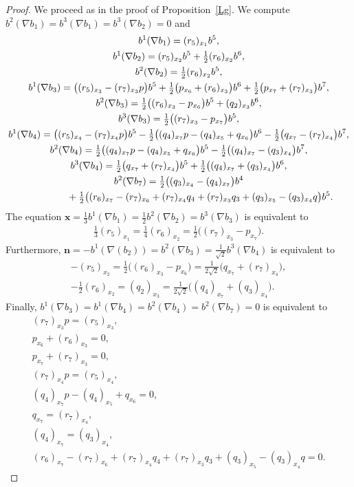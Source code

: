 \documentclass[pdftex]{sigma}
\numberwithin{equation}{section}
\newcommand\bx{{\mathbf x}}
\newcommand\bn{{\mathbf n}}
\begin{document}
\begin{proof}
We proceed as in the proof of Proposition~\ref{Lg}. We compute $b^2(\nabla b_1)=b^3(\nabla b_1) =b^3(\nabla b_2) =0$ and
\begin{gather*}
b^1(\nabla b_1) = (r_5)_{x_1} b^5, \\
b^1(\nabla b_2)= (r_5)_{x_2} b^5+\tfrac12 (r_6)_{x_2} b^6,\\
b^2(\nabla b_2)= \tfrac12 (r_6)_{x_2} b^5,\\
b^1(\nabla b_3)= \big((r_5)_{x_3}- (r_7)_{x_3 }p\big) b^5+\tfrac12 \big(p_{x_6}+(r_6)_{x_3}\big) b^6+\tfrac12 \big(p_{x_7}+(r_7)_{x_3}\big) b^7,\\
 b^2(\nabla b_3)= \tfrac12 \big((r_6)_{x_3}-p_{x_6}\big) b^5 +(q_2)_{x_3}b^6,\\
b^3(\nabla b_3)= \tfrac12 \big((r_7)_{x_3}-p_{x_7}\big) b^5,\\
b^1(\nabla b_4)= \big((r_5)_{x_4}-(r_7)_{x_4}p\big)b^5-\tfrac12\big((q_4)_{x_7}p-(q_4)_{x_5}+q_{x_6} \big)b^6-\tfrac12\big(q_{x_7}-(r_7)_{x_4}\big)b^7,\\
b^2(\nabla b_4)= \tfrac12\big((q_4)_{x_7}p-(q_4)_{x_5}+q_{x_6}\big)b^5-\tfrac12\big((q_4)_{x_7}-(q_3)_{x_4}\big)b^7,\\
b^3(\nabla b_4)= \tfrac12\big(q_{x_7}+(r_7)_{x_4}\big)b^5+\tfrac12\big((q_4)_{x_7}+(q_3)_{x_4}\big)b^6,\\
b^2(\nabla b_7)= \tfrac12\big((q_3)_{x_4}-(q_4)_{x_7}\big)b^4 \\
\hphantom{b^2(\nabla b_7)=}{} +\tfrac12\big((r_6)_{x_7} -(r_7)_{x_6}+(r_7)_{x_4}q_4+(r_7)_{x_3}q_3+(q_3)_{x_5}-(q_3)_{x_4}q\big)b^5.
\end{gather*}
The equation $\bx=\frac13 b^1(\nabla b_1)=\frac12 b^2(\nabla b_2)=b^3(\nabla b_3)$ is equivalent to
\begin{gather}
\tfrac13(r_5)_{x_1} = \tfrac14(r_6)_{x_2} =\tfrac12 \big((r_7)_{x_3}-p_{x_7}\big).\label{ED1}
\end{gather}
Furthermore, $\bn=-b^1(\nabla(b_2))=b^2(\nabla b_3)=\frac1{\sqrt 2} b^3(\nabla b_4)$ is equivalent to
\begin{gather}
 -(r_5)_{x_2} =\tfrac12 \big((r_6)_{x_3}-p_{x_6}\big)=\tfrac1{2\sqrt 2} \big(q_{x_7}+(r_7)_{x_4}\big),\label{ED2}\\
- \tfrac12 (r_6)_{x_2} =(q_2)_{x_3} =\tfrac1{2\sqrt 2}\big((q_4)_{x_7}+(q_3)_{x_4}\big).\label{ED3}
\end{gather}
Finally, $ b^1(\nabla b_3) =b^1(\nabla b_4)=b^2(\nabla b_4 )=b^2(\nabla b_7)=0$ is equivalent to
\begin{gather}
 (r_7)_{x_3 }p=(r_5)_{x_3}, \label{ED4}\\
 p_{x_6}+(r_6)_{x_3}=0, \label{ED5}\\
 p_{x_7}+(r_7)_{x_3}=0, \label{ED6}\\
(r_7)_{x_4}p=(r_5)_{x_4}, \label{ED7}\\
(q_4)_{x_7}p-(q_4)_{x_5}+q_{x_6} =0, \label{ED8}\\
q_{x_7}=(r_7)_{x_4}, \label{ED9}\\
(q_4)_{x_7}=(q_3)_{x_4}, \label{ED11}\\
 (r_6)_{x_7}-(r_7)_{x_6}+(r_7)_{x_4}q_4+(r_7)_{x_3}q_3+(q_3)_{x_5}-(q_3)_{x_4}q=0.\label{ED12}
 \end{gather}


\end{proof}
\end{document}
